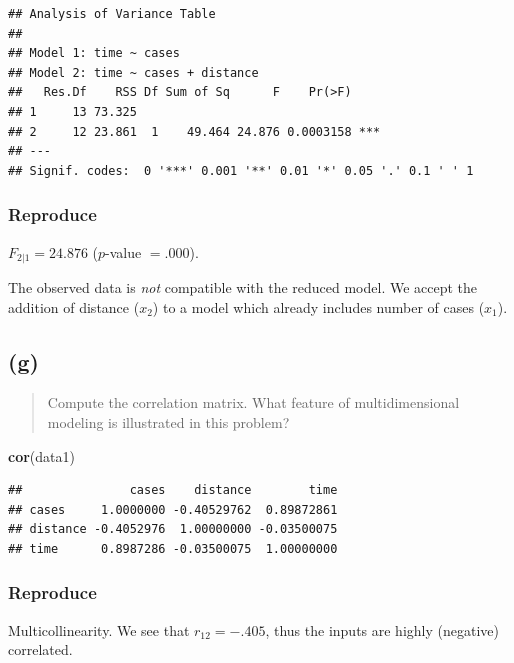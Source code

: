 \documentclass[
]{article}
\newenvironment{Shaded}{\begin{snugshade}}{\end{snugshade}}
\newcommand{\FunctionTok}[1]{\textcolor[rgb]{0.13,0.29,0.53}{\textbf{#1}}}
\newcommand{\NormalTok}[1]{#1}
\begin{document}
\begin{verbatim}
## Analysis of Variance Table
## 
## Model 1: time ~ cases
## Model 2: time ~ cases + distance
##   Res.Df    RSS Df Sum of Sq      F    Pr(>F)    
## 1     13 73.325                                  
## 2     12 23.861  1    49.464 24.876 0.0003158 ***
## ---
## Signif. codes:  0 '***' 0.001 '**' 0.01 '*' 0.05 '.' 0.1 ' ' 1
\end{verbatim}

\hypertarget{reproduce-5}{%
\subsubsection{Reproduce}\label{reproduce-5}}

\(F_{2|1} = 24.876\) (\(p\)-value \(= .000\)).

The observed data is \emph{not} compatible with the reduced model. We
accept the addition of distance (\(x_2\)) to a model which already
includes number of cases (\(x_1\)).

\hypertarget{g}{%
\subsection{(g)}\label{g}}

\begin{quote}
Compute the correlation matrix. What feature of multidimensional
modeling is illustrated in this problem?
\end{quote}

\begin{Shaded}
\begin{Highlighting}[]
\FunctionTok{cor}\NormalTok{(data1)}
\end{Highlighting}
\end{Shaded}

\begin{verbatim}
##               cases    distance        time
## cases     1.0000000 -0.40529762  0.89872861
## distance -0.4052976  1.00000000 -0.03500075
## time      0.8987286 -0.03500075  1.00000000
\end{verbatim}

\hypertarget{reproduce-6}{%
\subsubsection{Reproduce}\label{reproduce-6}}

Multicollinearity. We see that \(r_{1 2} = -.405\), thus the inputs are
highly (negative) correlated.
\end{document}
